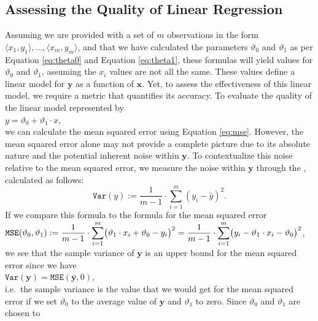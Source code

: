\subsection{Assessing the Quality of Linear Regression}
Assuming we are provided with a set of $m$ observations in the form $\langle x_1, y_1\rangle, \ldots, \langle
x_m, y_m\rangle$, and that we have calculated the parameters $\vartheta_0$ and $\vartheta_1$ as per Equation
\ref{eq:theta0} and Equation \ref{eq:theta1}, these formulas will yield values for $\vartheta_0$ and
$\vartheta_1$, assuming the $x_i$ values are not all the same. These values define a linear model for $\mathbf{y}$
as a function of $\mathbf{x}$. Yet, to assess the effectiveness of this linear model, we require a metric that
quantifies its accuracy. To evaluate the quality of the linear model represented by 
\\[0.2cm]
\hspace*{1.3cm}
$y = \vartheta_0 + \vartheta_1 \cdot x$,
\\[0.2cm]
we can calculate the mean squared error using Equation \ref{eq:mse}. However, the mean squared error alone may
not provide a complete picture due to its absolute nature and the potential inherent noise within
$\mathbf{y}$. To contextualize this noise relative to the mean squared error, we measure the noise within
$\mathbf{y}$ through the  , calculated as follows: 
\begin{equation}
  \label{eq:var}
  \mathtt{Var}(y) := \frac{1}{m-1} \cdot \sum_{i=1}^m (y_i - \bar{y})^2.
\end{equation}
If we compare this formula to the formula for the mean squared error
\\[0.2cm]
\hspace*{1.3cm}
$\displaystyle\mathtt{MSE}(\vartheta_0, \vartheta_1) := 
    \frac{1}{m-1} \cdot\sum\limits_{i=1}^m \bigl(\vartheta_1 \cdot x_i + \vartheta_0 - y_i\bigr)^2
=   \frac{1}{m-1} \cdot\sum\limits_{i=1}^m \bigl(y_i - \vartheta_1 \cdot x_i - \vartheta_0\bigr)^2
$,
\\[0.2cm]
we see that the sample variance of $\mathbf{y}$ is an upper bound for the mean squared error since we have
\\[0.2cm]
\hspace*{1.3cm}
$\mathtt{Var}(\mathbf{y}) = \mathtt{MSE}(\bar{\mathbf{y}}, 0)$,
\\[0.2cm]
i.e.~the sample variance is the value that we would get for the mean squared error if we set $\vartheta_0$ to
the average value of $\mathbf{y}$ and $\vartheta_1$ to zero.  Since $\vartheta_0$ and $\vartheta_1$ are chosen to
